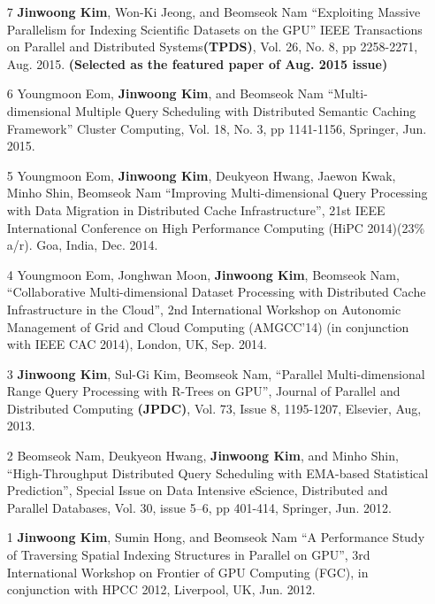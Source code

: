 \documentclass[margin,line]{res}
\begin{document}
\begin{resume}
{\begin{enumerate}
\item[7] {\bf Jinwoong Kim}, Won-Ki Jeong, and Beomseok Nam ``Exploiting
Massive Parallelism for Indexing Scientific Datasets on the GPU'' IEEE
Transactions on Parallel and Distributed Systems{\bf (TPDS)}, Vol. 26, No. 8,
pp 2258-2271, Aug. 2015. {\bf (Selected as the featured paper of Aug. 2015
issue)}

\item[6] Youngmoon Eom, {\bf Jinwoong Kim}, and Beomseok Nam
``Multi-dimensional Multiple Query Scheduling with Distributed Semantic Caching
Framework'' Cluster Computing, Vol. 18, No. 3, pp 1141-1156, Springer, Jun. 2015.

\item[5] Youngmoon Eom, {\bf Jinwoong Kim}, Deukyeon Hwang, Jaewon Kwak, Minho
Shin, Beomseok Nam ``Improving Multi-dimensional Query Processing with Data
Migration in Distributed Cache Infrastructure'', 21st IEEE International
Conference on High Performance Computing (HiPC 2014)(23\% a/r). Goa, India, Dec. 2014.

\item[4] Youngmoon Eom, Jonghwan Moon, {\bf Jinwoong Kim}, Beomseok Nam,
``Collaborative Multi-dimensional Dataset Processing with Distributed Cache
Infrastructure in the Cloud'', 2nd International Workshop on Autonomic
Management of Grid and Cloud Computing (AMGCC'14) (in conjunction with IEEE CAC
2014), London, UK, Sep. 2014.

\item[3] {\bf Jinwoong Kim}, Sul-Gi Kim, Beomseok Nam, ``Parallel
Multi-dimensional Range Query Processing with R-Trees on GPU'', Journal of
Parallel and Distributed Computing {\bf (JPDC)}, Vol. 73, Issue 8, 1195-1207,
Elsevier, Aug, 2013.

\item[2] Beomseok Nam, Deukyeon Hwang, { \bf Jinwoong Kim}, and Minho Shin,
``High-Throughput Distributed Query Scheduling with EMA-based Statistical
Prediction'', Special Issue on Data Intensive eScience, Distributed and
Parallel Databases, Vol. 30, issue 5--6, pp 401-414, Springer, Jun. 2012.

\item[1] {\bf Jinwoong Kim}, Sumin Hong, and Beomseok Nam ``A Performance
Study of Traversing Spatial Indexing Structures in Parallel on GPU'', 3rd
International Workshop on Frontier of GPU Computing (FGC), in conjunction with
HPCC 2012, Liverpool, UK, Jun. 2012.

\end{enumerate}

}
\end{resume}
\end{document}
